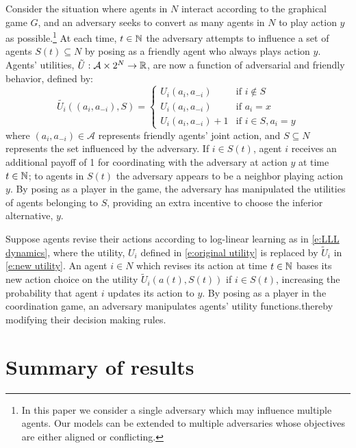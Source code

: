 Consider the situation where agents in $N$ interact according to the graphical game $G$, and an adversary seeks to  convert as many agents in $N$ to play action $y$ as possible.\footnote{In this paper we consider a single adversary which may influence multiple agents. Our models can be extended to multiple adversaries whose objectives are either aligned or conflicting.} 
At each time, $t\in \mathbb{N}$ the adversary attempts to influence a set of agents $S(t)\subseteq N$ by posing as a friendly agent who always plays action $y$. Agents' utilities, $\tilde{U}:\mathcal{A}\times 2^N\to\mathbb{R}$, are now a function of adversarial and friendly behavior, defined by:
\begin{equation}\label{e:new utility}
\tilde{U_i}((a_i,a_{-i}),S) = %
\begin{cases}
U_i(a_i,a_{-i})	&\text{if } i\notin S\\
U_i(a_i,a_{-i})	&\text{if } a_i = x\\
U_i(a_i,a_{-i}) + 1 &\text{if } i\in S,  a_i = y 
\end{cases}
\end{equation}
where $(a_i,a_{-i})\in\mathcal{A}$ represents friendly agents' joint action, and $S\subseteq N$ represents the set influenced by the adversary.
If  $i\in S(t)$, agent $i$ receives an additional payoff of 1 for coordinating with the adversary at action $y$ at time $t\in\mathbb{N}$; to agents in $S(t)$ the adversary appears to be a neighbor playing action $y$. By posing as a player in the game, the adversary has manipulated the utilities of agents belonging to $S$, providing an extra incentive to choose the inferior alternative, $y$. 

Suppose agents revise their actions according to log-linear learning as in \eqref{e:LLL dynamics}, where the utility, $U_i$ defined in \eqref{e:original utility} is replaced by $\tilde{U}_i$ in \eqref{e:new utility}. An agent $i\in N$ which revises its action at time $t\in\mathbb{N}$ bases its new action choice on the utility $\tilde{U}_i(a(t),S(t))$ if $i\in S(t)$, increasing the probability that agent $i$ updates its action to $y$. By posing as a player in the coordination game, an adversary manipulates agents' utility functions.thereby modifying their decision making rules.



\section{Summary of results}

